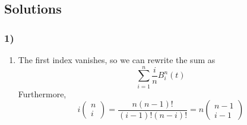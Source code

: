 \subsection{Solutions}
\label{subsec:Solutions}
\subsubsection{1) }
\begin{enumerate}
    \item 
        The first index vanishes, so we can rewrite the sum as 
        \[
            \sum_{i=1}^{n} \frac{ i }{ n  }  B _{ i  }^{ n  } (t) 
        \]
        Furthermore, 
        \[
        i \begin{pmatrix*}
            n   \\
            i  
        \end{pmatrix*}
        = \frac{ n\left( n-1\right) !  }{ \left( i-1\right) !\left( n-i\right) ! } = 
        n\begin{pmatrix*}
            n-1  \\
            i-1  
        \end{pmatrix*}
         
\]
\end{enumerate}
